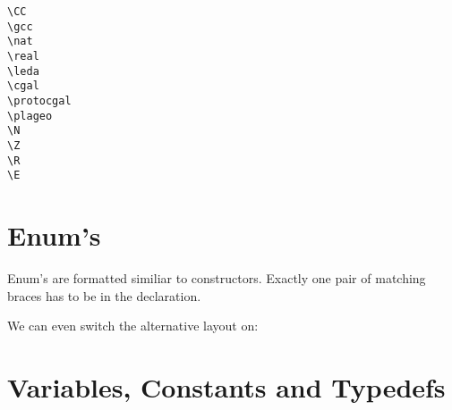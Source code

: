 \documentclass[12pt]{article}
\begin{document}
{\begin{tabbing}
  \> \verb+\CC+         \> \CC         \\
  \> \verb+\gcc+        \> \gcc        \\
  \> \verb+\nat+        \> \nat        \\
  \> \verb+\real+       \> \real       \\
  \> \verb+\leda+       \> \leda       \\
  \> \verb+\cgal+       \> \cgal       \\
  \> \verb+\protocgal+  \> \protocgal  \\
  \> \verb+\plageo+     \> \plageo     \\ 
  \> \verb+\+\verb+N+        \> \N        \\
  \> \verb+\+\verb+Z+        \> \Z        \\
  \> \verb+\+\verb+R+        \> \R        \\
  \> \verb+\+\verb+E+        \> \E
\end{tabbing}

\section{Enum's}

Enum's are formatted similiar to constructors. Exactly one pair of
matching braces has to be in the declaration.




We can even switch the alternative layout on:

\def\ccLongParamLayout{\ccTrue}


\def\ccLongParamLayout{\ccFalse}


\section{Variables, Constants and Typedefs}

}
\end{document}
